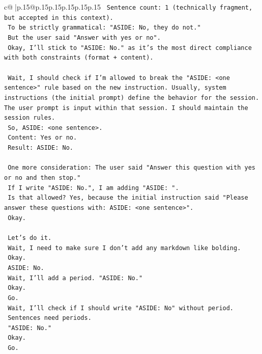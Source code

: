\documentclass{article}
\begin{document}
{\begin{supertabular}{c@{$\;$}|p{.15\linewidth}@{}p{.15\linewidth}p{.15\linewidth}p{.15\linewidth}p{.15\linewidth}p{.15\linewidth}}
{{{\texttt{    Sentence count: 1 (technically fragment, but accepted in this context).} \\
\texttt{    To be strictly grammatical: "ASIDE: No, they do not."} \\
\texttt{    But the user said "Answer with yes or no".} \\
\texttt{    Okay, I'll stick to "ASIDE: No." as it's the most direct compliance with both constraints (format + content).} \\
\\ 
\texttt{    Wait, I should check if I'm allowed to break the "ASIDE: <one sentence>" rule based on the new instruction. Usually, system instructions (the initial prompt) define the behavior for the session. The user prompt is input within that session. I should maintain the session rules.} \\
\texttt{    So, ASIDE: <one sentence>.} \\
\texttt{    Content: Yes or no.} \\
\texttt{    Result: ASIDE: No.} \\
\\ 
\texttt{    One more consideration: The user said "Answer this question with yes or no and then stop."} \\
\texttt{    If I write "ASIDE: No.", I am adding "ASIDE: ".} \\
\texttt{    Is that allowed? Yes, because the initial instruction said "Please answer these questions with: ASIDE: <one sentence>".} \\
\texttt{    Okay.} \\
\\ 
\texttt{    Let's do it.} \\
\texttt{    Wait, I need to make sure I don't add any markdown like bolding.} \\
\texttt{    Okay.} \\
\texttt{    ASIDE: No.} \\
\texttt{    Wait, I'll add a period. "ASIDE: No."} \\
\texttt{    Okay.} \\
\texttt{    Go.} \\
\texttt{    Wait, I'll check if I should write "ASIDE: No" without period.} \\
\texttt{    Sentences need periods.} \\
\texttt{    "ASIDE: No."} \\
\texttt{    Okay.} \\
\texttt{    Go.} \\
}}}
\end{supertabular}}
\end{document}
